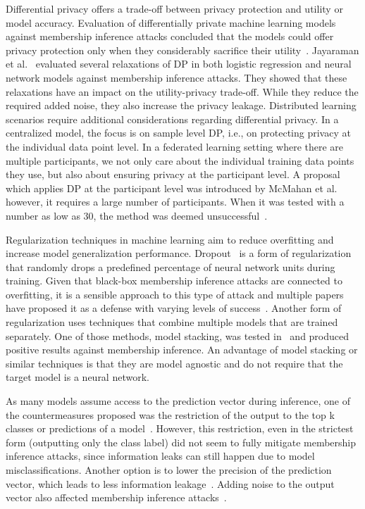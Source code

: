 Differential privacy offers a trade-off between privacy protection and utility or model accuracy. Evaluation of differentially private machine learning models against membership inference attacks concluded that the models could offer privacy protection only when they considerably sacrifice their utility~. Jayaraman et al.~ evaluated several relaxations of DP in both logistic regression and neural network models against membership inference attacks. They showed that these relaxations have an impact on the utility-privacy trade-off. While they reduce the required added noise, they also increase the privacy leakage.
Distributed learning scenarios require additional considerations regarding differential privacy. In a centralized model, the focus is on sample level DP, i.e., on protecting privacy at the individual data point level. In a federated learning setting where there are multiple participants, we not only care about the individual training data points they use, but also about ensuring privacy at the participant level. A proposal which applies DP at the participant level was introduced by McMahan et al.~ however, it requires a large number of participants. When it was tested with a number as low as 30, the method was deemed unsuccessful~.

Regularization techniques in machine learning aim to reduce overfitting and increase model generalization performance. Dropout~ is a form of regularization that randomly drops a predefined percentage of neural network units during training. Given that black-box membership inference attacks are connected to overfitting, it is a sensible approach to this type of attack and multiple papers have proposed it as a defense with varying levels of success~. Another form of regularization uses techniques that combine multiple models that are trained separately. One of those methods, model stacking, was tested in~ and produced positive results against membership inference. An advantage of model stacking or similar techniques is that they are model agnostic and do not require that the target model is a neural network.

As many models assume access to the prediction vector during inference, one of the countermeasures proposed was the restriction of the output to the top k classes or predictions of a model~. However, this restriction, even in the strictest form (outputting only the class label) did not seem to fully mitigate membership inference attacks, since information leaks can still happen due to model misclassifications. Another option is to lower the precision of the prediction vector, which leads to less information leakage~. Adding noise to the output vector also affected membership inference attacks~.

